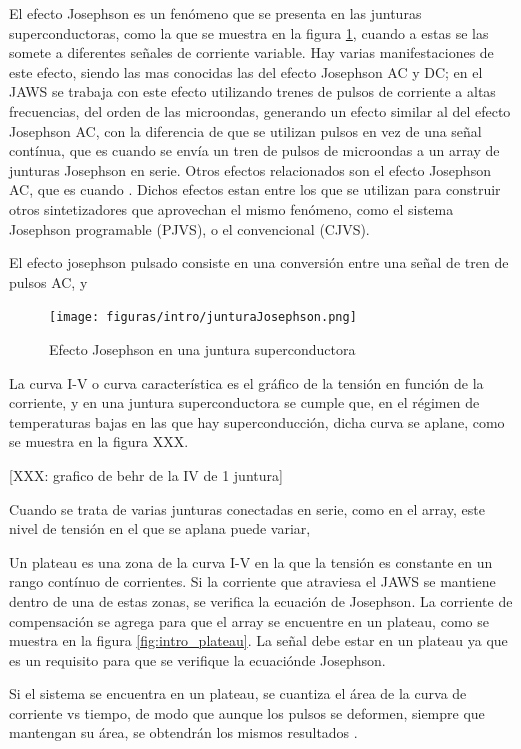 \documentclass[twoside]{article}
\begin{document}
\begin{multicols}{2}
    El efecto Josephson es un fenómeno que se presenta en las junturas superconductoras, como la que se muestra en la figura \ref{fig:intro_junturaJosephson}, cuando a estas se las somete a diferentes señales de corriente variable. Hay varias manifestaciones de este efecto, siendo las mas conocidas las del efecto Josephson AC y DC; en el JAWS se trabaja con este efecto utilizando trenes de pulsos de corriente a altas frecuencias, del orden de las microondas, generando un efecto similar al del efecto Josephson AC, con la diferencia de que se utilizan pulsos en vez de una señal contínua, que es cuando se envía un tren de pulsos de microondas a un array de junturas Josephson en serie. Otros efectos relacionados son el efecto Josephson AC, que es cuando . Dichos efectos estan entre los que se utilizan para construir otros sintetizadores que aprovechan el mismo fenómeno, como el sistema Josephson programable (PJVS), o el convencional (CJVS). 

    El efecto josephson pulsado consiste en una conversión entre una señal de tren de pulsos AC,  y 



\begin{figure}[H]
    \centering
    \texttt{[image: figuras/intro/junturaJosephson.png]}
    \caption{Efecto Josephson en una juntura superconductora}
    \label{fig:intro_junturaJosephson}
\end{figure}

La curva I-V o curva característica es el gráfico de la tensión en función de la corriente, y en una juntura superconductora se cumple que, en el régimen de temperaturas bajas en las que hay superconducción, dicha curva se aplane, como se muestra en la figura XXX. 

[XXX: grafico de behr de la IV de 1 juntura]

Cuando se trata de varias junturas conectadas en serie, como en el array, este nivel de tensión en el que se aplana puede variar, 

Un plateau es una zona de la curva I-V en la que la tensión es constante en un rango contínuo de corrientes. Si la corriente que atraviesa el JAWS se mantiene dentro de una de estas zonas, se verifica la ecuación de Josephson.
La corriente de compensación se agrega para que el array se encuentre en un plateau, como se muestra en la figura \ref{fig:intro_plateau}. La señal debe estar en un plateau ya que es un requisito para que se verifique la ecuaciónde Josephson.

Si el sistema se encuentra en un plateau, se cuantiza el área de la curva de corriente vs tiempo, de modo que aunque los pulsos se deformen, siempre que mantengan su área, se obtendrán los mismos resultados \cite{benz1998}. 


\end{multicols}
\end{document}
